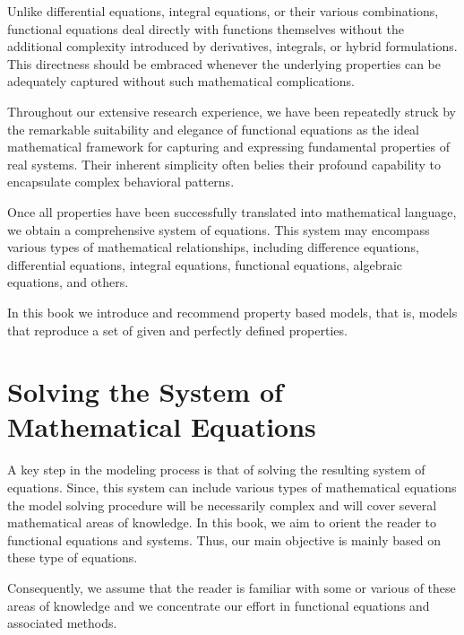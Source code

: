Unlike differential equations, integral equations, or their various combinations, functional equations deal directly with functions themselves without the additional complexity introduced by derivatives, integrals, or hybrid formulations. This directness should be embraced whenever the underlying properties can be adequately captured without such mathematical complications.

Throughout our extensive research experience, we have been repeatedly struck by the remarkable suitability and elegance of functional equations as the ideal mathematical framework for capturing and expressing fundamental properties of real systems. Their inherent simplicity often belies their profound capability to encapsulate complex behavioral patterns.

Once all properties have been successfully translated into mathematical language, we obtain a comprehensive system of equations. This system may encompass various types of mathematical relationships, including difference equations, differential equations, integral equations, functional equations, algebraic equations, and others.

In this book we introduce and recommend property based models, that is, models that reproduce a set of given and perfectly defined properties.

\section{Solving the System of Mathematical Equations}
A key step in the modeling process is that of solving the resulting system of equations. Since, this system can include various types of mathematical equations the model solving procedure will be necessarily complex and will cover several mathematical areas of knowledge. In this book, we aim to orient the reader to functional equations and systems. Thus, our main objective is mainly based on these type of equations.

Consequently, we assume that the reader is familiar with some or various of these areas of knowledge and we concentrate our effort in functional equations and associated methods.

